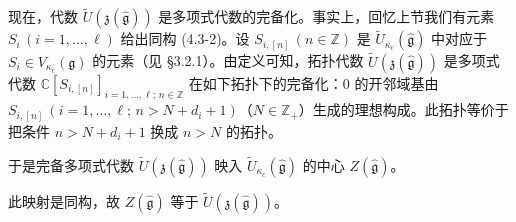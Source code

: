 现在，代数 $\widetilde{U}(\mathfrak{z}(\hat{\mathfrak{g}}))$ 是多项式代数的完备化。事实上，回忆上节我们有元素 $S_i\,(i=1,\dots,\ell)$ 给出同构 (4.3-2)。设 $S_{i,[n]}\,(n\in\mathbb{Z})$ 是 $\widetilde{U}_{\kappa_c}(\hat{\mathfrak{g}})$ 中对应于 $S_i\in V_{\kappa_c}(\mathfrak{g})$ 的元素（见 §3.2.1）。由定义可知，拓扑代数 $\widetilde{U}(\mathfrak{z}(\hat{\mathfrak{g}}))$ 是多项式代数 $\mathbb{C}[S_{i,[n]}]_{i=1,\dots,\ell;\,n\in\mathbb{Z}}$ 在如下拓扑下的完备化：$0$ 的开邻域基由 $S_{i,[n]}\,(i=1,\dots,\ell;\,n>N+d_i+1)$（$N\in\mathbb{Z}_+$）生成的理想构成。此拓扑等价于把条件 $n>N+d_i+1$ 换成 $n>N$ 的拓扑。

于是完备多项式代数 $\widetilde{U}(\mathfrak{z}(\hat{\mathfrak{g}}))$ 映入 $\widetilde{U}_{\kappa_c}(\hat{\mathfrak{g}})$ 的中心 $Z(\hat{\mathfrak{g}})$。

\begin{proposition}
    此映射是同构，故 $Z(\hat{\mathfrak{g}})$ 等于 $\widetilde{U}(\mathfrak{z}(\hat{\mathfrak{g}}))$。
\end{proposition}

